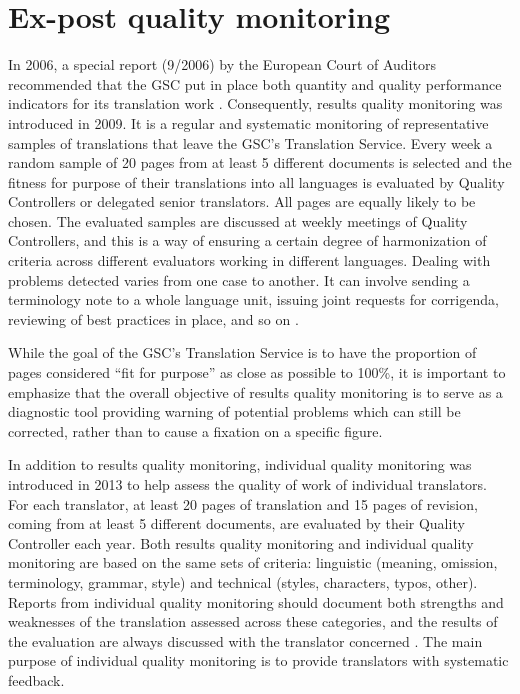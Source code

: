 \documentclass[output=paper]{langsci/langscibook}
\begin{document}
\section{Ex-post quality monitoring}\label{sec:hanzl:hanzl:5}

In 2006, a special report (9/2006) by the European Court of Auditors recommended that the GSC put in place both quantity and quality performance indicators for its translation work \citep{EuropeanCourt2006}. Consequently, results quality monitoring was introduced in 2009. It is a regular and systematic monitoring of representative samples of translations that leave the GSC’s Translation Service. Every week a random sample of 20 pages from at least 5 different documents is selected and the fitness for purpose of their translations into all languages is evaluated by Quality Controllers or delegated senior translators. All pages are equally likely to be chosen. The evaluated samples are discussed at weekly meetings of Quality Controllers, and this is a way of ensuring a certain degree of harmonization of criteria across different evaluators working in different languages. Dealing with problems detected varies from one case to another. It can involve sending a terminology note to a whole language unit, issuing joint requests for corrigenda, reviewing of best practices in place, and so on \citep[72]{Council2015}.

\largerpage
While the goal of the GSC's Translation Service is to have the proportion of pages considered “fit for purpose” as close as possible to 100\%, it is important to emphasize that the overall objective of results quality monitoring is to serve as a diagnostic tool providing warning of potential problems which can still be corrected, rather than to cause a fixation on a specific figure.

In addition to results quality monitoring, individual quality monitoring was introduced in 2013 to help assess the quality of work of individual translators. For each translator, at least 20 pages of translation and 15 pages of revision, coming from at least 5 different documents, are evaluated by their Quality Controller each year. Both results quality monitoring and individual quality monitoring are based on the same sets of criteria: linguistic (meaning, omission, terminology, grammar, style) and technical (styles, characters, typos, other). Reports from individual quality monitoring should document both strengths and weaknesses of the translation assessed across these categories, and the results of the evaluation are always discussed with the translator concerned \citep[72]{Council2015}. The main purpose of individual quality monitoring is to provide translators with systematic feedback.
\end{document}
